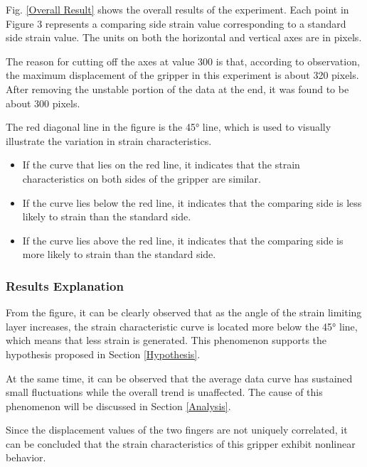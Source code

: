 \documentclass[conference]{IEEEtran}
\begin{document}
Fig. \ref{Overall Result} shows the overall results of the experiment. Each point in Figure 3 represents a comparing side strain value corresponding to a standard side strain value. The units on both the horizontal and vertical axes are in pixels. 

The reason for cutting off the axes at value 300 is that, according to observation, the maximum displacement of the gripper in this experiment is about 320 pixels. After removing the unstable portion of the data at the end, it was found to be about 300 pixels.



The red diagonal line in the figure is the 45° line, which is used to visually illustrate the variation in strain characteristics. 
\begin{itemize}
    \item If the curve that lies on the red line, it indicates that the strain characteristics on both sides of the gripper are similar. 
    \item If the curve lies below the red line, it indicates that the comparing side is less likely to strain than the standard side.
    \item If the curve lies above the red line, it indicates that the comparing side is more likely to strain than the standard side.
\end{itemize}


\subsubsection{Results Explanation}

From the figure, it can be clearly observed that as the angle of the strain limiting layer increases, the strain characteristic curve is located more below the 45° line, which means that less strain is generated. This phenomenon supports the hypothesis proposed in Section \ref{Hypothesis}.

At the same time, it can be observed that the average data curve has sustained small fluctuations while the overall trend is unaffected. The cause of this phenomenon will be discussed in Section \ref{Analysis}.

Since the displacement values of the two fingers are not uniquely correlated, it can be concluded that the strain characteristics of this gripper exhibit nonlinear behavior.
\end{document}
